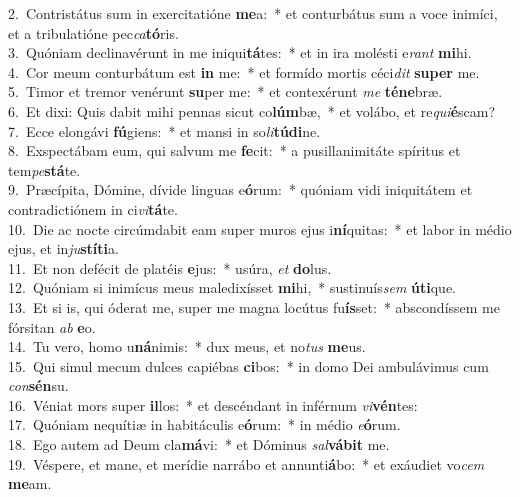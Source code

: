 {2.~}Contristátus sum in exercitatióne \textbf{me}a:~* et conturbátus sum a voce inimíci, et a tribulatióne pec\textit{ca}\textbf{tó}ris.\\
{3.~}Quóniam declinavérunt in me iniqui\textbf{tá}tes:~* et in ira molésti e\textit{rant} \textbf{mi}hi.\\
{4.~}Cor meum conturbátum est \textbf{in} me:~* et formído mortis céci\textit{dit} \textbf{su}\textbf{per} me.\\
{5.~}Timor et tremor venérunt \textbf{su}per me:~* et contexérunt \textit{me} \textbf{té}\textbf{ne}bræ.\\
{6.~}Et dixi: Quis dabit mihi pennas sicut co\textbf{lúm}bæ,~* et volábo, et re\textit{qui}\textbf{é}scam?\\
{7.~}Ecce elongávi \textbf{fú}giens:~* et mansi in so\textit{li}\textbf{tú}\textbf{di}ne.\\
{8.~}Exspectábam eum, qui salvum me \textbf{fe}cit:~* a pusillanimitáte spíritus et tem\textit{pe}\textbf{stá}te.\\
{9.~}Præcípita, Dómine, dívide linguas e\textbf{ó}rum:~* quóniam vidi iniquitátem et contradictiónem in ci\textit{vi}\textbf{tá}te.\\
{10.~}Die ac nocte circúmdabit eam super muros ejus i\textbf{ní}quitas:~* et labor in médio ejus, et in\textit{ju}\textbf{stí}\textbf{ti}a.\\
{11.~}Et non defécit de platéis \textbf{e}jus:~* usúra, \textit{et} \textbf{do}lus.\\
{12.~}Quóniam si inimícus meus maledixísset \textbf{mi}hi,~* sustinuís\textit{sem} \textbf{ú}\textbf{ti}que.\\
{13.~}Et si is, qui óderat me, super me magna locútus fu\textbf{ís}set:~* abscondíssem me fórsitan \textit{ab} \textbf{e}o.\\
{14.~}Tu vero, homo u\textbf{ná}nimis:~* dux meus, et no\textit{tus} \textbf{me}us.\\
{15.~}Qui simul mecum dulces capiébas \textbf{ci}bos:~* in domo Dei ambulávimus cum \textit{con}\textbf{sén}su.\\
{16.~}Véniat mors super \textbf{il}los:~* et descéndant in inférnum \textit{vi}\textbf{vén}tes:\\
{17.~}Quóniam nequítiæ in habitáculis e\textbf{ó}rum:~* in médio \textit{e}\textbf{ó}rum.\\
{18.~}Ego autem ad Deum cla\textbf{má}vi:~* et Dóminus \textit{sal}\textbf{vá}\textbf{bit} me.\\
{19.~}Véspere, et mane, et merídie narrábo et annunti\textbf{á}bo:~* et exáudiet vo\textit{cem} \textbf{me}am.\\
